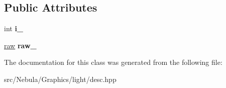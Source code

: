 \subsection*{\-Public \-Attributes}
\begin{DoxyCompactItemize}
\item 
\hypertarget{classNeb_1_1light_1_1desc_ab418cae849285845ccaf1083e64c762a}{int {\bfseries i\-\_\-}}\label{classNeb_1_1light_1_1desc_ab418cae849285845ccaf1083e64c762a}

\item 
\hypertarget{classNeb_1_1light_1_1desc_a53adc31d070f40782ce0115365479cb9}{\hyperlink{classNeb_1_1light_1_1raw}{raw} {\bfseries raw\-\_\-}}\label{classNeb_1_1light_1_1desc_a53adc31d070f40782ce0115365479cb9}

\end{DoxyCompactItemize}


\-The documentation for this class was generated from the following file\-:\begin{DoxyCompactItemize}
\item 
src/\-Nebula/\-Graphics/light/desc.\-hpp\end{DoxyCompactItemize}

